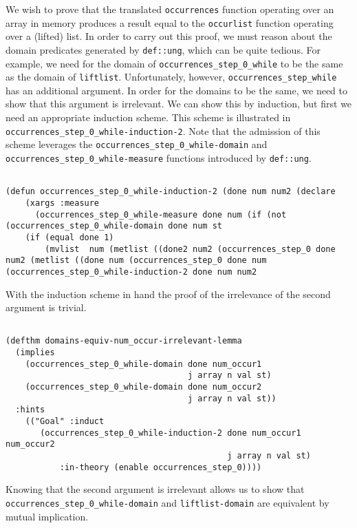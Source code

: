 \documentclass{eptcs}
\begin{document}
{We wish to prove that the translated \texttt{occurrences} function
operating over an array in memory produces a result equal to the
\texttt{occurlist} function operating over a (lifted) list.  In order to
carry out this proof, we must reason about the domain predicates
generated by \texttt{def::ung}, which can be quite tedious.  For
example, we need for the domain of \texttt{occurrences\_step\_0\_while}
to be the same as the domain of \texttt{liftlist}.  Unfortunately,
however, \texttt{occurrences\_step\_while} has an additional
argument.  In order for the domains to be the same, we need to show
that this argument is irrelevant.  We can show this by induction, but
first we need an appropriate induction scheme.  This scheme is
illustrated in \texttt{occurrences\_step\_0\_while-induction-2}.
Note that the admission of this scheme leverages the
\texttt{occurrences\_step\_0\_while-domain} and
\texttt{occurrences\_step\_0\_while-measure} functions introduced by
\texttt{def::ung}.

\begin{verbatim}

(defun occurrences_step_0_while-induction-2 (done num num2 (declare 
    (xargs :measure 
      (occurrences_step_0_while-measure done num (if (not (occurrences_step_0_while-domain done num st
    (if (equal done 1)
        (mvlist  num (metlist ((done2 num2 (occurrences_step_0 done num2 (metlist ((done num (occurrences_step_0 done num (occurrences_step_0_while-induction-2 done num num2 

\end{verbatim}

With the induction scheme in hand the proof of the irrelevance of the
second argument is trivial.

\begin{verbatim}

(defthm domains-equiv-num_occur-irrelevant-lemma
  (implies 
    (occurrences_step_0_while-domain done num_occur1
                                     j array n val st)
    (occurrences_step_0_while-domain done num_occur2
                                     j array n val st))
  :hints
    (("Goal" :induct
       (occurrences_step_0_while-induction-2 done num_occur1 num_occur2
                                             j array n val st)
           :in-theory (enable occurrences_step_0))))

\end{verbatim}

Knowing that the second argument is irrelevant allows us to show that
\texttt{occurrences\_step\_0\_while-domain} and
\texttt{liftlist-domain} are equivalent by mutual implication.
\begin{verbatim}


\end{verbatim}}
\end{document}
